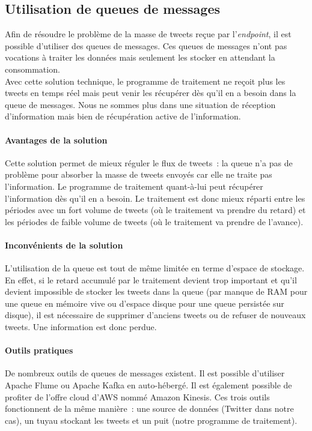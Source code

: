 \subsection{Utilisation de queues de messages}
\label{sub:Utilisation de queues de messages}

  Afin de résoudre le problème de la masse de tweets reçue par l'\textit{endpoint}, il est possible d'utiliser des queues de messages. Ces queues de messages n'ont pas vocations à traiter les données mais seulement les stocker en attendant la consommation.\\

  Avec cette solution technique, le programme de traitement ne reçoit plus les tweets en temps réel mais peut venir les récupérer dès qu'il en a besoin dans la queue de messages. Nous ne sommes plus dans une situation de réception d'information mais bien de récupération active de l'information.\\

  \paragraph{Avantages de la solution}
  Cette solution permet de mieux réguler le flux de tweets : la queue n'a pas de problème pour absorber la masse de tweets envoyés car elle ne traite pas l'information. Le programme de traitement quant-à-lui peut récupérer l'information dès qu'il en a besoin. Le traitement est donc mieux réparti entre les périodes avec un fort volume de tweets (où le traitement va prendre du retard) et les périodes de faible volume de tweets (où le traitement va prendre de l'avance).

  \paragraph{Inconvénients de la solution}
  L'utilisation de la queue est tout de même limitée en terme d'espace de stockage. En effet, si le retard accumulé par le traitement devient trop important et qu'il devient impossible de stocker les tweets dans la queue (par manque de RAM pour une queue en mémoire vive ou d'espace disque pour une queue persistée sur disque), il est nécessaire de supprimer d'anciens tweets ou de refuser de nouveaux tweets. Une information est donc perdue.

  \paragraph{Outils pratiques}
  De nombreux outils de queues de messages existent. Il est possible d'utiliser Apache Flume ou Apache Kafka en auto-hébergé. Il est également possible de profiter de l'offre cloud d'AWS nommé Amazon Kinesis. Ces trois outils fonctionnent de la même manière : une source de données (Twitter dans notre cas), un tuyau stockant les tweets et un puit (notre programme de traitement).\\

